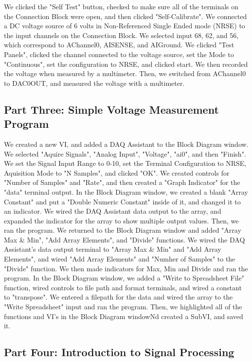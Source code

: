 \documentclass[twoside,10pt]{article}
\begin{document}
\begin{multicols}{2}
		We clicked the "Self Test" button, checked to make sure all of the terminals on the Connection Block were open, and then clicked "Self-Calibrate". We connected a DC voltage source of 6 volts in Non-Referenced Single Ended mode (NRSE) to the input channels on the Connection Block. We selected input 68, 62, and 56, which correspond to AChannel0, AISENSE, and AIGround. We clicked "Test Panels", clicked the channel connected to the voltage source, set the Mode to "Continuous", set the configuration to NRSE, and clicked start. We then recorded the voltage when measured by a multimeter. Then, we switched from AChannel0 to DAC0OUT, and measured the voltage with a multimeter.  
		
		
		\subsection*{Part Three: Simple Voltage Measurement Program}
		
		We created a new VI, and added a DAQ Assistant to the Block Diagram window. We selected "Aquire Signals", "Analog Input", "Voltage", "ai0", and then "Finish". We set the Signal Input Range to 0-10, set the Terminal Configuration to NRSE, Aquisition Mode to "N Samples", and clicked "OK". We created controls for "Number of Samples" and "Rate", and then created a "Graph Indicator" for the "data" terminal output. In the Block Diagram window, we created a blank "Array Constant" and put a "Double Numeric Constant" inside of it, and changed it to an indicator. We wired the DAQ Assistant data output to the array, and expanded the indicator for the array to show multiple output values. Then, we ran the program. We returned to the Block Diagram window and added "Array Max \& Min", "Add Array Elements", and "Divide" functions. We wired the DAQ Assistant's data output terminal to "Array Max \& Min" and "Add Array Elements", and wired "Add Array Elements" and "Numher of Samples" to the "Divide" function. We then made indicators for Max, Min and Divide and ran the program. In the Block Diagram window, we added a "Write to Spreadsheet File" function, wired controls to file path and format terminals, and wired a constant to "transpose". We entered a filepath for the data and wired the array to the "Write Spreadsheet" input and ran the program. Then, we highlighted all of the functions and VI's in the Block Diagram windowNd created a SubVI, and saved it. 
		
		
		
		\subsection*{Part Four: Introduction to Signal Processing}
		

\end{multicols}
\end{document}
